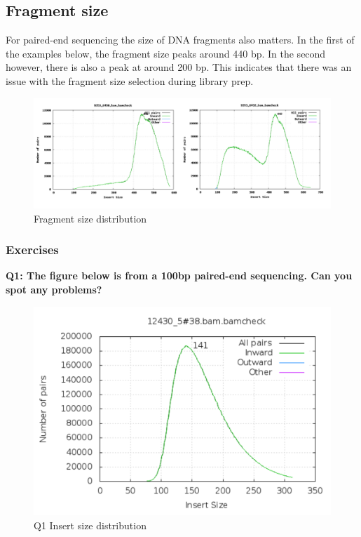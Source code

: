\documentclass[11pt]{article}
\begin{document}
    \hypertarget{fragment-size}{%
\subsection{Fragment size}\label{fragment-size}}

For paired-end sequencing the size of DNA fragments also matters. In the
first of the examples below, the fragment size peaks around 440 bp. In
the second however, there is also a peak at around 200 bp. This
indicates that there was an issue with the fragment size selection
during library prep.

    \begin{figure}[!h]
\centering
\includegraphics{img/fragment_size_comparison.png}
\caption{Fragment size distribution}
\end{figure}

    \hypertarget{exercises}{%
\subsubsection{Exercises}\label{exercises}}

\textbf{Q1: The figure below is from a 100bp paired-end sequencing. Can
you spot any problems?}

    \begin{figure}[!h]
\centering
\includegraphics{img/insert_size_quiz.png}
\caption{Q1 Insert size distribution}
\end{figure}
\end{document}
